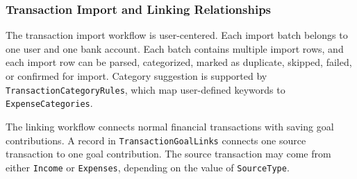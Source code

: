 ﻿\documentclass{article}
\begin{document}
\subsubsection{Transaction Import and Linking Relationships}

The transaction import workflow is user-centered. Each import batch belongs to one user and one
bank account. Each batch contains multiple import rows, and each import row can be parsed,
categorized, marked as duplicate, skipped, failed, or confirmed for import. Category suggestion
is supported by \texttt{TransactionCategoryRules}, which map user-defined keywords to
\texttt{ExpenseCategories}.

The linking workflow connects normal financial transactions with saving goal contributions. A
record in \texttt{TransactionGoalLinks} connects one source transaction to one goal contribution.
The source transaction may come from either \texttt{Income} or \texttt{Expenses}, depending on the
value of \texttt{SourceType}.
\end{document}
